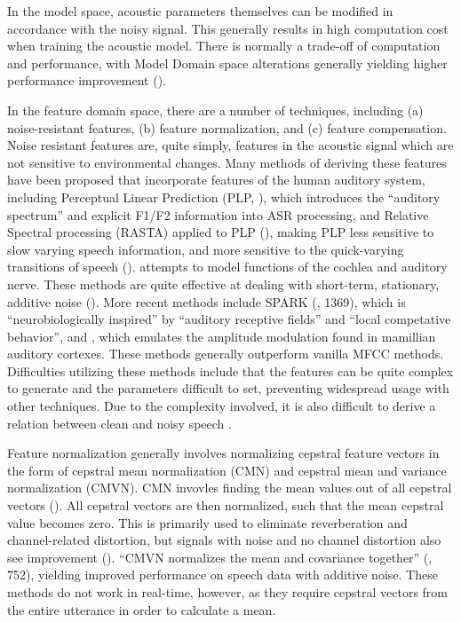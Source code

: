 \documentclass[dissertation,copyright]{uathesis}
\begin{document}
In the model space, acoustic parameters themselves can be modified in accordance with the noisy signal.  This generally results in high computation cost when training the acoustic model.  There is normally a trade-off of computation and performance, with Model Domain space alterations generally yielding higher performance improvement (\cite{li:14}).

In the feature domain space, there are a number of techniques, including (a) noise-resistant features, (b) feature normalization, and  (c) feature compensation.  Noise resistant features are, quite simply, features in the acoustic signal which are not sensitive to environmental changes.  Many methods of deriving these features have been proposed that incorporate features of the human auditory system, including Perceptual Linear Prediction (PLP, \cite{hermansky:85}), which introduces the ``auditory spectrum'' and explicit F1/F2 information into ASR processing, and Relative Spectral processing (RASTA) applied to PLP (\cite{hermansky:92}), making PLP less sensitive to slow varying speech information, and more sensitive to the quick-varying transitions of speech (\cite{story:10}).  \cite{kim:99} attempts to model functions of the cochlea and auditory nerve. These methods are quite effective at dealing with short-term, stationary, additive noise (\cite{zhang:17}).  More recent methods include SPARK (\cite{fazel:12}, 1369), which is ``neurobiologically inspired'' by ``auditory receptive fields'' and ``local competative behavior'', and \cite{moritz:15}, which emulates the amplitude modulation found in mamillian auditory cortexes.  These methods generally outperform vanilla MFCC methods. Difficulties utilizing these methods include that the features can be quite complex to generate and the parameters difficult to set, preventing widespread usage with other techniques.  Due to the complexity involved, it is also difficult to derive a relation between clean and noisy speech \cite{li:14}.

Feature normalization generally involves normalizing cepstral feature vectors in the form of cepstral mean normalization (CMN) and cepstral mean and variance normalization (CMVN).  CMN invovles finding the mean values out of all cepstral vectors (\cite{atal:74}).  All cepstral vectors are then normalized, such that the mean cepstral value becomes zero.  This is primarily used to eliminate reverberation and channel-related distortion, but signals with noise and no channel distortion also see improvement (\cite{droppo:08}).  ``CMVN normalizes the mean and covariance together'' (\cite{li:14}, 752), yielding improved performance on speech data with additive noise.
These methods do not work in real-time, however, as they require cepstral vectors from the entire utterance in order to calculate a mean.
\end{document}
